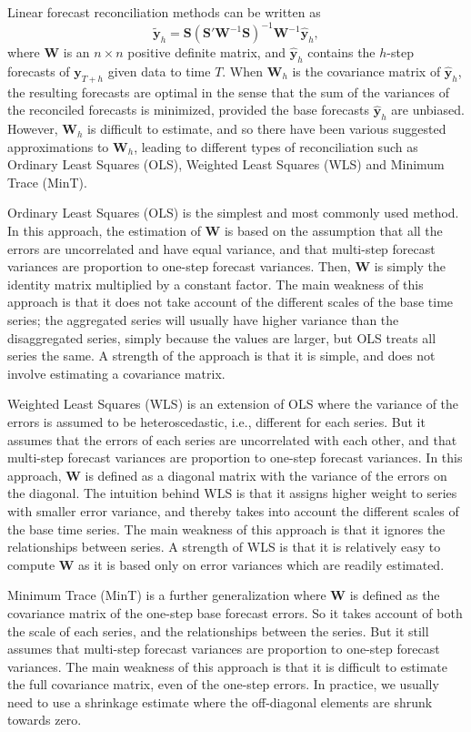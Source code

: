 \documentclass[
  authoryear,
  preprint,
  3p]{elsarticle}
\begin{document}
Linear forecast reconciliation methods can be written
\citep{WicEtAl2019} as \[
  \tilde{\bm{y}}_h = \bm{S}(\bm{S}'\bm{W}^{-1}\bm{S})^{-1}\bm{W}^{-1}\hat{\bm{y}}_h,
\] where \(\bm{W}\) is an \(n \times n\) positive definite matrix, and
\(\hat{\bm{y}}_h\) contains the \(h\)-step forecasts of \(\bm{y}_{T+h}\)
given data to time \(T\). When \(\bm{W}_h\) is the covariance matrix of
\(\hat{\bm{y}}_h\), the resulting forecasts are optimal in the sense
that the sum of the variances of the reconciled forecasts is minimized,
provided the base forecasts \(\hat{\bm{y}}_h\) are unbiased. However,
\(\bm{W}_h\) is difficult to estimate, and so there have been various
suggested approximations to \(\bm{W}_h\), leading to different types of
reconciliation such as Ordinary Least Squares (OLS), Weighted Least
Squares (WLS) and Minimum Trace (MinT).

Ordinary Least Squares (OLS) is the simplest and most commonly used
method. In this approach, the estimation of \(\bm{W}\) is based on the
assumption that all the errors are uncorrelated and have equal variance,
and that multi-step forecast variances are proportion to one-step
forecast variances. Then, \(\bm{W}\) is simply the identity matrix
multiplied by a constant factor. The main weakness of this approach is
that it does not take account of the different scales of the base time
series; the aggregated series will usually have higher variance than the
disaggregated series, simply because the values are larger, but OLS
treats all series the same. A strength of the approach is that it is
simple, and does not involve estimating a covariance matrix.

Weighted Least Squares (WLS) is an extension of OLS where the variance
of the errors is assumed to be heteroscedastic, i.e., different for each
series. But it assumes that the errors of each series are uncorrelated
with each other, and that multi-step forecast variances are proportion
to one-step forecast variances. In this approach, \(\bm{W}\) is defined
as a diagonal matrix with the variance of the errors on the diagonal.
The intuition behind WLS is that it assigns higher weight to series with
smaller error variance, and thereby takes into account the different
scales of the base time series. The main weakness of this approach is
that it ignores the relationships between series. A strength of WLS is
that it is relatively easy to compute \(\bm{W}\) as it is based only on
error variances which are readily estimated.

Minimum Trace (MinT) is a further generalization where \(\bm{W}\) is
defined as the covariance matrix of the one-step base forecast errors.
So it takes account of both the scale of each series, and the
relationships between the series. But it still assumes that multi-step
forecast variances are proportion to one-step forecast variances. The
main weakness of this approach is that it is difficult to estimate the
full covariance matrix, even of the one-step errors. In practice, we
usually need to use a shrinkage estimate where the off-diagonal elements
are shrunk towards zero.
\end{document}
